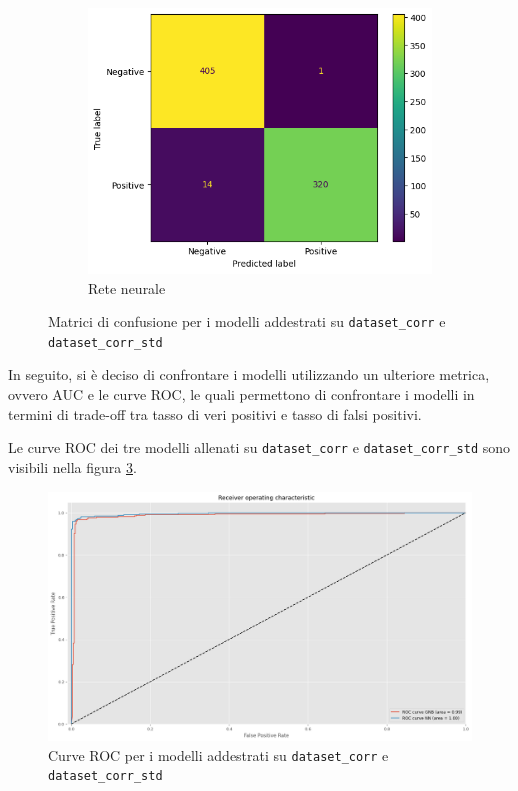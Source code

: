 \begin{figure}[!ht]
\begin{subfigure}{.45\textwidth}
    \end{subfigure}
    \hfill
    \begin{subfigure}{.45\textwidth}
        \centering
        \includegraphics[width=\textwidth]{img/rete/matrice_confusione.png}
        \caption{Rete neurale}
        \label{fig:matrice_di_confusione_per_NN_corr}
    \end{subfigure}
    \caption{Matrici di confusione per i modelli addestrati su \texttt{dataset\_corr} e \texttt{dataset\_corr\_std}}
    \label{fig:matrice_di_confusione_per_corr}
\end{figure}

In seguito, si è deciso di confrontare i modelli utilizzando un ulteriore metrica,
ovvero AUC e le curve ROC, le quali permettono di confrontare i modelli in termini 
di trade-off tra tasso di veri positivi e tasso di falsi positivi.

Le curve ROC dei tre modelli allenati su \texttt{dataset\_corr} e \texttt{dataset\_corr\_std}
sono visibili nella figura \ref{fig:roc_curve_corr}.

\begin{figure}[!ht]
    \centering
    \includegraphics[width=\textwidth]{img/ris/roc_curve_corr.png}
    \caption{Curve ROC per i modelli addestrati su \texttt{dataset\_corr} e \texttt{dataset\_corr\_std}}
    \label{fig:roc_curve_corr}
\end{figure}

